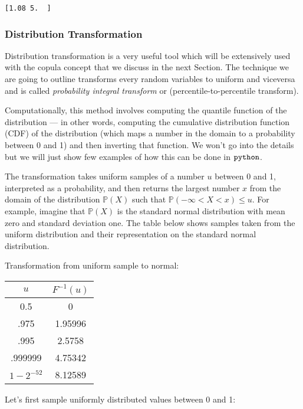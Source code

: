 \documentclass[11pt]{article}
\begin{document}
    \begin{Verbatim}[commandchars=\\\{\}]
[1.08 5.  ]
    \end{Verbatim}

    \hypertarget{distribution-transformation}{%
\subsubsection{Distribution
Transformation}\label{distribution-transformation}}

Distribution transformation is a very useful tool which will be
extensively used with the copula concept that we discuss in the next
Section. The technique we are going to outline transforms every random
variables to uniform and viceversa and is called
\emph{probability integral transform} or (percentile-to-percentile
transform).

Computationally, this method involves computing the quantile function of
the distribution --- in other words, computing the cumulative
distribution function (CDF) of the distribution (which maps a number in
the domain to a probability between 0 and 1) and then inverting that
function. We won't go into the details but we will just show few
examples of how this can be done in \(\tt{python}\).

The transformation takes uniform samples of a number \(u\) between 0 and
1, interpreted as a probability, and then returns the largest number
\(x\) from the domain of the distribution \(\mathbb{P}(X)\) such that
\(\mathbb{P}(-\infty <X<x)\le u\). For example, imagine that
\(\mathbb{P}(X)\) is the standard normal distribution with mean zero and
standard deviation one. The table below shows samples taken from the
uniform distribution and their representation on the standard normal
distribution.

Transformation from uniform sample to normal:

\begin{longtable}[]{@{}cc@{}}
\toprule
\(u\) & \(F^{-1}(u)\)\tabularnewline
\midrule
\endhead
0.5 & 0\tabularnewline
.975 & 1.95996\tabularnewline
.995 & 2.5758\tabularnewline
.999999 & 4.75342\tabularnewline
\(1-2^{-52}\) & 8.12589\tabularnewline
\bottomrule
\end{longtable}

Let's first sample uniformly distributed values between 0 and 1:
\end{document}
